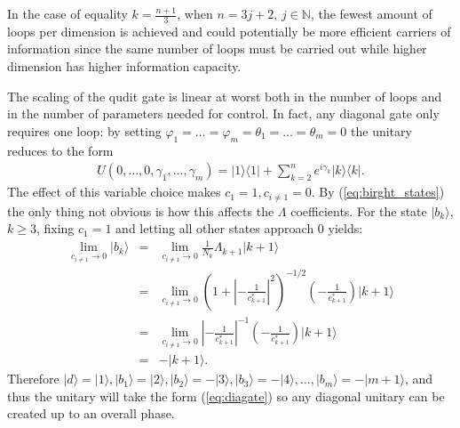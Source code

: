 \documentclass[pra,showpacs,priprent,twocolumn,superscriptaddress]{revtex4-1}
\newcommand{\ket}[1]{|#1\rangle}
\newcommand{\bra}[1]{\langle #1|}
\begin{document}
In the case of equality $k =\frac{n+1}{3}$, when $n = 3j + 2,\, j \in \mathbb{N}$, the fewest amount of loops per dimension is achieved and could potentially be more efficient carriers of information since the same number of loops must be carried out while higher dimension has higher information capacity.

The scaling of the qudit gate is linear at worst both in the number of loops and in the number of parameters needed for control. In fact, any diagonal gate only requires one loop: by setting $\varphi_1 = \dots = \varphi_m = \theta_1 = \dots = \theta_m = 0$ the unitary reduces to the form
\begin{eqnarray}
\label{eq:diagate}
U(0,\dots,0,\gamma_1,\dots,\gamma_m) = \ket{1}\bra{1} + \sum_{k = 2}^n e^{i\gamma_k}\ket{k}\bra{k}.
\end{eqnarray}
The effect of this variable choice makes $c_1 = 1, c_{i\neq 1} = 0$. By (\ref{eq:birght_states}) the only thing not obvious is how this affects the $\Lambda$ coefficients.
For the state $\ket{b_k}$, $k \geq 3$, fixing $c_1 = 1$ and letting all other states approach $0$ yields:
\begin{eqnarray}
\lim_{c_{i\neq 1} \rightarrow 0} \ket{b_k} &=& \lim_{c_{i\neq 1} \rightarrow 0}\frac{1}{N_k}\Lambda_{k+1} \ket{k+1} \nonumber \\
&=& \lim_{c_{i\neq 1} \rightarrow 0} \left(1  + \left|-\frac{1}{c_{k+1}^{*}}\right|^2 \right)^{-1/2}\left(-\frac{1}{c_{k+1}^{*}}\right) \ket{k+1} \nonumber\\
&=& \lim_{c_{i\neq 1} \rightarrow 0} \left|-\frac{1}{c_{k+1}^{*}}\right|^{-1}\left(-\frac{1}{c_{k+1}^{*}}\right) \ket{k+1} \nonumber\\
&=& -\ket{k+1}.
\end{eqnarray}
Therefore $\ket{d} = \ket{1}, \ket{b_1} = \ket{2}, \ket{b_2} = -\ket{3}, \ket{b_3} = -\ket{4}, \dots, \ket{b_m} = -\ket{m+1}$, and thus the unitary will take the form (\ref{eq:diagate}) so any diagonal unitary can be created up to an overall phase. 
\end{document}
